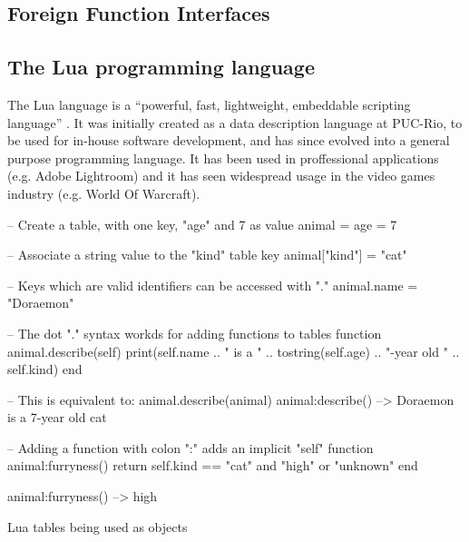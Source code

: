 \subsection{Foreign Function Interfaces}
	\label{sec:context-ffis}


\subsection{The Lua programming language}
	\label{sec:lua-programming-lang}

The Lua language is a “powerful, fast, lightweight, embeddable scripting
language” \cite{lua-about}. It was initially created as a data description
language at \gls{PUC-Rio}, to be used for in-house software development, and
has since evolved into a general purpose programming language. It has been
used in proffessional applications (e.g. Adobe Lightroom) and it has seen
widespread usage in the video games industry (e.g. World Of Warcraft).


\begin{listing}
  \begin{luacode}
    -- Create a table, with one key, "age" and 7 as value
    animal = { age = 7 }

    -- Associate a string value to the "kind" table key
    animal["kind"] = "cat"

    -- Keys which are valid identifiers can be accessed with "."
    animal.name = "Doraemon"

    -- The dot "." syntax workds for adding functions to tables
    function animal.describe(self)
      print(self.name .. " is a " .. tostring(self.age) ..
            "-year old " .. self.kind)
    end

    -- This is equivalent to: animal.describe(animal)
    animal:describe()  --> Doraemon is a 7-year old cat

    -- Adding a function with colon ":" adds an implicit "self"
    function animal:furryness()
      return self.kind == "cat" and "high" or "unknown"
    end

    animal:furryness()  --> high
  \end{luacode}
	\caption{Lua tables being used as objects}
  \label{lst:lua-example-tables}
\end{listing}

